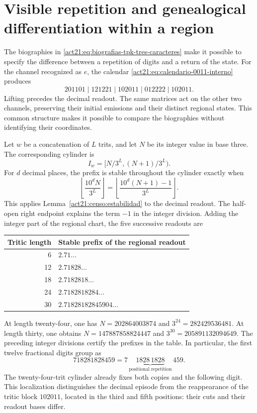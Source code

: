 \section{Visible repetition and genealogical differentiation within a region}
\label{md:ejemplo:region}
The biographies in \eqref{act21:eq:biografias-tpk-tres-caracteres}
make it possible to specify the difference between a repetition of digits and a
return of the state. For the channel recognized as \(e\), the
calendar \eqref{act21:eq:calendario-0011-interno} produces
\[
 201101\mid121221\mid102011\mid012222\mid102011.
\]
Lifting precedes the decimal readout. The same matrices act
on the other two channels, preserving their initial emissions and their
distinct regional states. This common structure makes it possible to compare
the biographies without identifying their coordinates.

Let \(w\) be a concatenation of \(L\) trits, and let \(N\) be its integer
value in base three. The corresponding cylinder is
\[
 I_w=[N/3^L,(N+1)/3^L).
\]
For \(d\) decimal places, the prefix is stable throughout the
cylinder exactly when
\[
 \left\lfloor\frac{10^dN}{3^L}\right\rfloor
 =\left\lfloor\frac{10^d(N+1)-1}{3^L}\right\rfloor.
\]
This applies Lemma~\ref{act21:censo:estabilidad} to the decimal
readout. The half-open right endpoint explains the term \(-1\)
in the integer division. Adding the integer part of the regional chart,
the five successive readouts are
\begin{center}
\begin{tabular}{@{}rl@{}}
\toprule
Tritic length & Stable prefix of the regional readout\\
\midrule
6 & \(2.71\ldots\)\\
12 & \(2.71828\ldots\)\\
18 & \(2.7182818\ldots\)\\
24 & \(2.7182818284\ldots\)\\
30 & \(2.71828182845904\ldots\)\\
\bottomrule
\end{tabular}
\end{center}
At length twenty-four, one has
\(N=202864003874\) and \(3^{24}=282429536481\).
At length thirty, one obtains
\(N=147887858824447\) and \(3^{30}=205891132094649\).
The preceding integer divisions certify the prefixes in the table.
In particular, the first twelve fractional digits group as
\[
 718281828459
 =7\,\underbrace{1828\,1828}_{\text{positional repetition}}\,459.
\]
The twenty-four-trit cylinder already fixes both copies and the
following digit. This localization distinguishes the decimal episode from the
reappearance of the tritic block \(102011\), located in the
third and fifth positions: their cuts and their readout bases differ.

